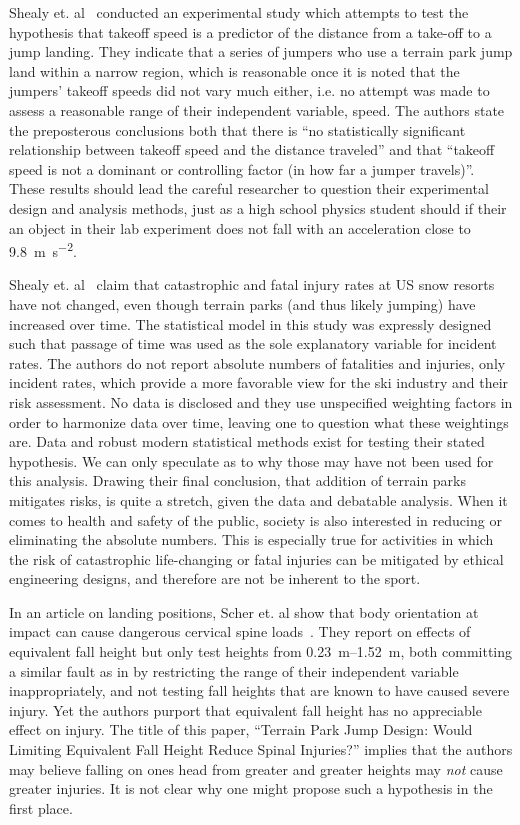 \documentclass[smallextended]{svjour3}       %
\begin{document}
Shealy et. al~\cite{Shealy2010} conducted an experimental study which attempts
to test the hypothesis that takeoff speed is a predictor of the distance from a
take-off to a jump landing. They indicate that a series of jumpers who use a
terrain park jump land within a narrow region, which is reasonable once it is
noted that the jumpers' takeoff speeds did not vary much either, i.e. no
attempt was made to assess a reasonable range of their independent variable, speed. The authors state the preposterous conclusions both that there is ``no statistically significant relationship between takeoff speed and the distance traveled'' and that ``takeoff speed is not a dominant or controlling factor (in how far a jumper
travels)''. These results should lead the careful researcher to question their
experimental design and analysis methods, just as a high school physics student
should if their an object in their lab experiment does not fall with an
acceleration close to 9.8~\si{\meter\per\second\squared}.

Shealy et. al~\cite{Shealy2015} claim that catastrophic and fatal injury rates
at US snow resorts have not changed, even though terrain parks (and thus likely
jumping) have increased over time. The statistical model in this study was
expressly designed such that passage of time was used as the sole explanatory
variable for incident rates. The authors do not report absolute numbers of
fatalities and injuries, only incident rates, which provide a more favorable
view for the ski industry and their risk assessment. No data is disclosed and
they use unspecified weighting factors in order to harmonize data over time,
leaving one to question what these weightings are. Data and robust modern
statistical methods exist for testing their stated hypothesis. We can only
speculate as to why those may have not been used for this analysis. Drawing
their final conclusion, that addition of terrain parks mitigates risks, is
quite a stretch, given the data and debatable analysis. When it comes to health
and safety of the public, society is also interested in reducing or eliminating
the absolute numbers.  This is especially true for activities in which the risk
of catastrophic life-changing or fatal injuries can be mitigated by ethical
engineering designs, and therefore are not be inherent to the sport.

In an article on landing positions, Scher et. al show that body orientation at
impact can cause dangerous cervical spine loads~\cite{Scher2015}. They report
on effects of equivalent fall height but only test heights from
\SIrange{0.23}{1.52}{\meter}, both committing a similar fault as in by
\cite{Shealy2010} restricting the range of their independent variable
inappropriately, and not testing fall heights that are known to have caused
severe injury. Yet the authors purport that equivalent fall height has no
appreciable effect on injury. The title of this paper, ``Terrain Park Jump
Design: Would Limiting Equivalent Fall Height Reduce Spinal Injuries?'' implies
that the authors may believe falling on ones head from greater and greater
heights may \emph{not} cause greater injuries. It is not clear why one might
propose such a hypothesis in the first place.
\end{document}
